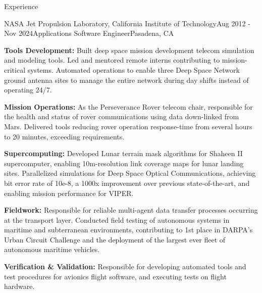 \documentclass{resume} %
\begin{document}
\begin{rSection}{Experience}
\begin{rSubsection}{NASA Jet Propulsion Laboratory, California Institute of Technology}{Aug 2012 - Nov 2024}{Applications Software Engineer}{Pasadena, CA}


\item {\bf{Tools Development:}}
Built deep space mission development telecom simulation and modeling tools. Led and mentored remote interns contributing to mission-critical systems. Automated operations to enable three Deep Space Network ground antenna sites to manage the entire network during day shifts instead of operating 24\slash 7.


\item {\bf{Mission Operations:}}
As the Perseverance Rover telecom chair, responsible for the health and status of rover communications using data down-linked from Mars. Delivered tools reducing rover operation response-time from several hours to 20 minutes, exceeding requirements. 


\item {\bf{Supercomputing:}} 
Developed Lunar terrain mask algorithms for Shaheen II supercomputer, enabling 10m-resolution link coverage maps for lunar landing sites. Parallelized simulations for Deep Space Optical Communications, achieving bit error rate of 10e-8, a 1000x improvement over previous state-of-the-art, and enabling mission performance for VIPER. 
 

\item {\bf{Fieldwork:}} 
Responsible for reliable multi-agent data transfer processes occurring at the transport layer. Conducted field testing of autonomous systems in maritime and subterranean environments, contributing to 1st place in DARPA’s Urban Circuit Challenge and the deployment of the largest ever fleet of autonomous maritime vehicles. 


\item {\bf{Verification \& Validation:}} 
Responsible for developing automated tools and test procedures for avionics flight software, and executing tests on flight hardware. 


\end{rSubsection}






\end{rSection}
\end{document}
